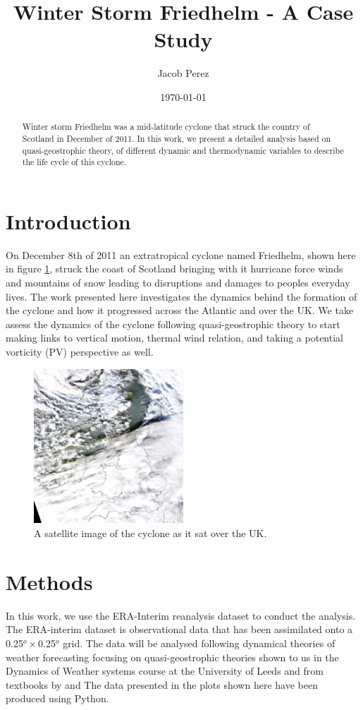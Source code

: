 \documentclass[12pt,a4paper]{article}
\title{\textbf{Winter Storm Friedhelm} - A Case Study}
\date{\today}
\author{Jacob Perez}
\begin{document}
\maketitle
\begin{abstract}
    Winter storm Friedhelm was a mid-latitude cyclone that struck the country of Scotland in December of 2011. In this work, we present a detailed analysis based on quasi-geostrophic theory, of different dynamic and thermodynamic variables to describe the life cycle of this cyclone. 
\end{abstract}
\tableofcontents
\section{Introduction}
On December 8th of 2011 an extratropical cyclone named Friedhelm, shown here in figure \ref{friedhelm}, struck the coast of Scotland bringing with it hurricane force winds and mountains of snow leading to disruptions and damages to peoples everyday lives. The work presented here investigates the dynamics behind the formation of the cyclone and how it progressed across the Atlantic and over the UK. We take assess the dynamics of the cyclone following quasi-geostrophic theory to start making links to vertical motion, thermal wind relation, and taking a potential vorticity (PV) perspective as well. 
\begin{figure}[H]
    \centering
    \includegraphics[width=0.5\textwidth]{friedhelm.jpg}
    \caption{A satellite image of the cyclone as it sat over the UK.}
    \label{friedhelm}
\end{figure}
\section{Methods}
In this work, we use the ERA-Interim reanalysis dataset to conduct the analysis. The ERA-interim dataset is observational data that has been assimilated onto a 0.25$^o \times$0.25$^o$ grid. The data will be analysed following dynamical theories of weather forecasting focusing on quasi-geostrophic theories shown to us in the Dynamics of Weather systems course at the University of Leeds and from textbooks by \cite{Hoskins2013} and \cite{Holton2015} The data presented in the plots shown here have been produced using Python. 
\end{document}
